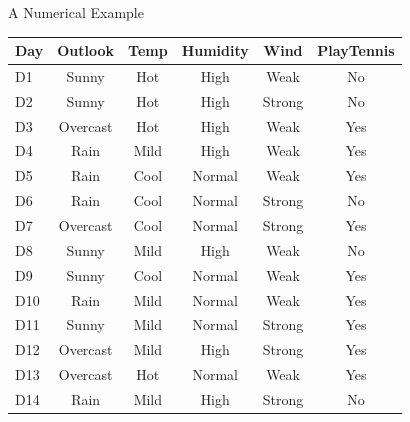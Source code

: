 \documentclass[9pt,dvipsnames]{beamer}
\begin{document}
	\begin{frame}{A Numerical Example}
		\begin{center}
					\begin{tabular}{|l|c|c|c|c|c|}\hline \textbf{Day} & \textbf{Outlook} & \textbf{Temp} & \textbf{Humidity} & \textbf{Wind} & \textbf{PlayTennis} \\ \hline D1 & Sunny & Hot & High & Weak & No \\ \hline D2 & Sunny & Hot & High & Strong & No \\ \hline D3 & Overcast & Hot & High & Weak & Yes \\ \hline D4 & Rain & Mild & High & Weak & Yes \\ \hline D5 & Rain & Cool & Normal & Weak & Yes \\ \hline D6 & Rain & Cool & Normal & Strong & No \\ \hline D7 & Overcast & Cool & Normal & Strong & Yes \\ \hline D8 & Sunny & Mild & High & Weak & No \\ \hline D9 & Sunny & Cool & Normal & Weak & Yes \\ \hline D10 & Rain & Mild & Normal & Weak & Yes \\ \hline D11 & Sunny & Mild & Normal & Strong & Yes \\ \hline D12 & Overcast & Mild & High & Strong & Yes \\ \hline D13 & Overcast & Hot & Normal & Weak & Yes \\ \hline D14 & Rain & Mild & High & Strong & No \\ \hline\end{tabular}
		\end{center}
	\end{frame}
	
\end{document}
